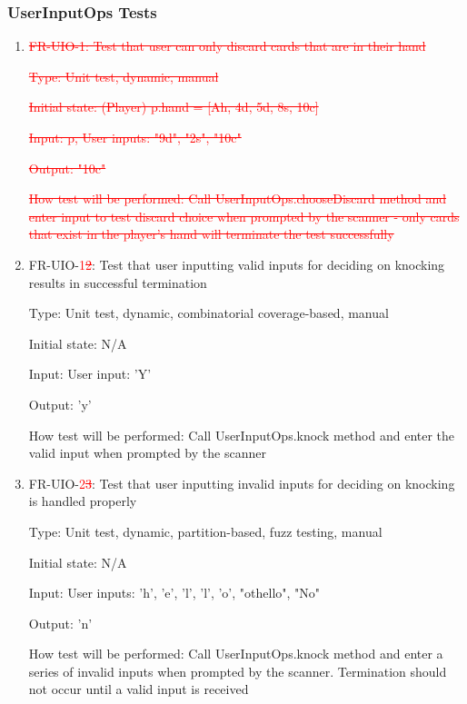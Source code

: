 \documentclass[12pt, titlepage]{article}
\begin{document}
\subsubsection{UserInputOps Tests}
\begin{enumerate}
    \item{\textcolor{red}{\sout{FR-UIO-1: Test that user can only discard cards that are in their hand}}}
    
    \textcolor{red}{\sout{Type: Unit test, dynamic, manual}}
    
    \textcolor{red}{\sout{Initial state: (Player) p.hand = [Ah, 4d, 5d, 8s, 10c]}}
    
    \textcolor{red}{\sout{Input: p, User inputs: "9d", "2s", "10c"}}
    
    \textcolor{red}{\sout{Output: "10c"}}
    
    \textcolor{red}{\sout{How test will be performed: Call UserInputOps.chooseDiscard method and enter input to test discard choice when prompted by the scanner - only cards that exist in the player's hand will terminate the test successfully}}
    
    \item{FR-UIO-\textcolor{red}{1\sout{2}}: Test that user inputting valid inputs for deciding on knocking results in successful termination}
    
    Type: Unit test, dynamic, combinatorial coverage-based, manual
    
    Initial state: N/A
    
    Input: User input: 'Y'
    
    Output: 'y'
    
    How test will be performed: Call UserInputOps.knock method and enter the valid input when prompted by the scanner
    
    \item{FR-UIO-\textcolor{red}{2\sout{3}}: Test that user inputting invalid inputs for deciding on knocking is handled properly}
    
    Type: Unit test, dynamic, partition-based, fuzz testing, manual
    
    Initial state: N/A
    
    Input: User inputs: 'h', 'e', 'l', 'l', 'o', "othello", "No"
    
    Output: 'n'
    
    How test will be performed: Call UserInputOps.knock method and enter a series of invalid inputs when prompted by the scanner. Termination should not occur until a valid input is received
    

\end{enumerate}
\end{document}
